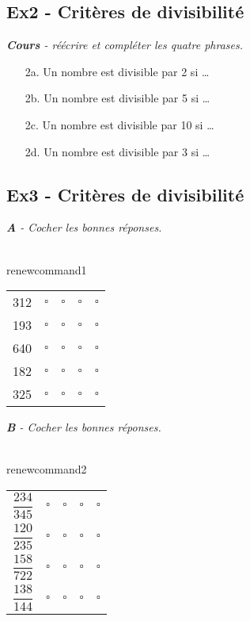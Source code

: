 \documentclass[12pt]{article}
\begin{document}
\subsection*{Ex2 - Critères de divisibilité}

\textit{\textbf{Cours} - réécrire et compléter les quatre phrases.}

\begin{multicols}{2}
  \begin{enumerate}
    \item[2a.] Un nombre est divisible par  2 si \dots
    \item[2b.] Un nombre est divisible par  5 si \dots
    \item[2c.] Un nombre est divisible par 10 si \dots
    \item[2d.] Un nombre est divisible par  3 si \dots
  \end{enumerate} 
\end{multicols}

\subsection*{Ex3 - Critères de divisibilité}

\textit{\textbf{A} - Cocher les bonnes réponses.}

\\renewcommand{\arraystretch}{1}

\begin{tabular}{c@{ est divisible : \kern1cm}l@{ par 2\kern1cm}l@{ par 3\kern1cm}l@{ par 5\kern1cm}l@{ par 10}}
  312 & $\square$ & $\square$ & $\square$ & $\square$ \\
  193 & $\square$ & $\square$ & $\square$ & $\square$ \\
  640 & $\square$ & $\square$ & $\square$ & $\square$ \\
  182 & $\square$ & $\square$ & $\square$ & $\square$ \\
  325 & $\square$ & $\square$ & $\square$ & $\square$ \\
\end{tabular}

\textit{\textbf{B} - Cocher les bonnes réponses.}

\\renewcommand{\arraystretch}{2}

\begin{tabular}{c@{ est divisible : \kern1cm}l@{ par 2\kern1cm}l@{ par 3\kern1cm}l@{ par 5\kern1cm}l@{ par 10}}
  $\dfrac{234}{345}$ & $\square$ & $\square$ & $\square$ & $\square$ \\
  $\dfrac{120}{235}$ & $\square$ & $\square$ & $\square$ & $\square$ \\
  $\dfrac{158}{722}$ & $\square$ & $\square$ & $\square$ & $\square$ \\
  $\dfrac{138}{144}$ & $\square$ & $\square$ & $\square$ & $\square$ \\
\end{tabular}
\end{document}
